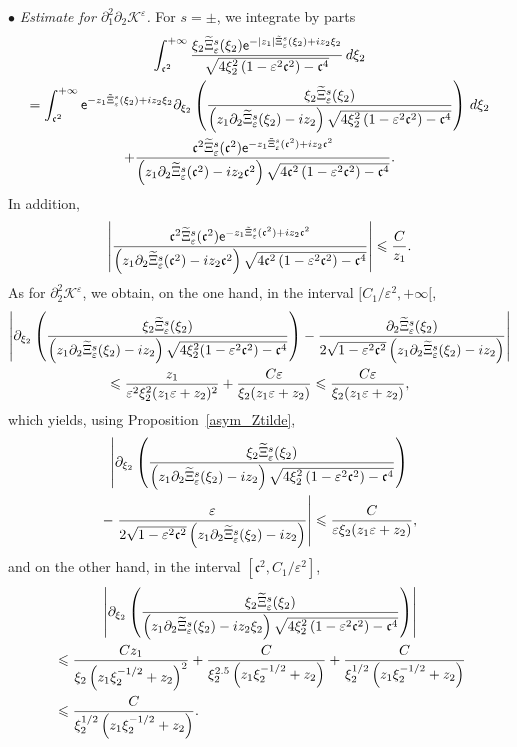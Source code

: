 \documentclass[10pt]{amsart}
\theoremstyle{definition}\newtheorem{defi}[theo]{Definition}\newtheorem{rema}[theo]{Remark}\newtheorem{exam}[theo]{Example}\newtheorem{exem}[theo]{Example}\newtheorem{nota}[theo]{Notation}
\newcommand*\p{\partial}
\newcommand*\BK{\mathcal{K}}
\newcommand*\ex{{\sf e}}
\newcommand*\cs{{\mathfrak c}}
\newcommand*\ii{\infty}
\newcommand*\ls{\leqslant }
\newcommand*\e{\varepsilon}
\renewcommand*\t{\tilde}
\let\oldtilde\tilde
\renewcommand*{\tilde}[1]{\mathchoice{\widetilde{#1}}{\widetilde{#1}}{\oldtilde{#1}}{\oldtilde{#1}}}
\begin{document}
\noindent $ \bullet $ \emph{Estimate for $ \p_1^2 \p_2 \BK^\e $.} For $ s = \pm $, we integrate by parts
\begin{multline}\label{IPP_K112_zero}
\int_{ \cs^2}^{+\ii} \frac{ \xi_2 \t\Xi_\e^s (\xi_2) \ex^{- |z_1| \t\Xi_\e^s (\xi_2) + i z_2 \xi_2} }{
\sqrt{ 4 \xi_2^2 \left(1 - \e^2 \cs^2\right) - \cs^4 } } \, d\xi_2
\\
 =
\int_{ \cs^2}^{+\ii} \ex^{- z_1 \t\Xi_\e^s (\xi_2) + i z_2 \xi_2 }
\p_{\xi_2} \left(\frac{ \xi_2 \t\Xi_\e^s (\xi_2) }{ \left(z_1 \p_2 \t\Xi_\e^s (\xi_2) - i z_2\right) \sqrt{ 4 \xi_2^2 \left(1 - \e^2 \cs^2\right) - \cs^4 } } \right) \, d\xi_2\\
+ \frac{ \cs^2 \t\Xi_\e^s (\cs^2) \ex^{- z_1 \t\Xi_\e^s (\cs^2) + i z_2 \cs^2 } }{\left(z_1 \p_2 \t\Xi_\e^s (\cs^2) - i z_2 \cs^2\right) \sqrt{ 4 \cs^2 \left(1 - \e^2 \cs^2\right) - \cs^4 } }.
\end{multline}
In addition,
\begin{align*}
\left\lvert
\frac{ \cs^2 \t\Xi_\e^s (\cs^2) \ex^{- z_1 \t\Xi_\e^s (\cs^2) + i z_2 \cs^2} }{\left(z_1 \p_2 \t\Xi_\e^s (\cs^2) - i z_2 \cs^2\right)
\sqrt{ 4 \cs^2\left(1 - \e^2 \cs^2\right) - \cs^4 } } \right\rvert
\ls \frac{C}{z_1 }.
\end{align*}
As for $ \p_2^2 \BK^\e $, we obtain, on the one hand, in the interval $ [C_1 / \e^{2}, +\ii [$,
\begin{multline*}
\left\lvert \p_{\xi_2} \left(\frac{ \xi_2 \t\Xi_\e^s (\xi_2) }{\left(z_1 \p_2 \t\Xi_\e^s (\xi_2) - i z_2\right) \sqrt{ 4 \xi_2^2 (1 - \e^2 \cs^2) - \cs^4 } } \right) - \frac{ \p_2 \t\Xi_\e^s (\xi_2) }{ 2 \sqrt{ 1 - \e^2 \cs^2 } \left(z_1 \p_2 \t\Xi_\e^s (\xi_2) - i z_2\right) }
\right\rvert
\\
\ls \frac{ z_1 }{ \e^2 \xi_2^2 (z_1 \e + z_2)^2 } + \frac{ C \e }{ \xi_2 (z_1 \e + z_2) }
\ls \frac{ C \e }{ \xi_2 (z_1 \e + z_2) },
\end{multline*}
which yields, using Proposition~\ref{asym_Ztilde},
\begin{multline}\label{IPPrevient}
\left\lvert \p_{\xi_2} \left(\frac{ \xi_2 \t\Xi_\e^s (\xi_2) }{\left(z_1 \p_2 \t\Xi_\e^s (\xi_2) - i z_2\right) \sqrt{ 4 \xi_2^2 \left(1 - \e^2 \cs^2\right) - \cs^4 } } \right)\right.\\ 
-\left. \frac{ \e }{ 2 \sqrt{ 1 - \e^2 \cs^2 } \left(z_1 \p_2 \t\Xi_\e^s (\xi_2) - i z_2\right) }
\right\rvert
\ls \frac{ C }{ \e \xi_2 (z_1 \e + z_2) },
\end{multline}
and on the other hand, in the interval $ [\cs^2, C_1 / \e^{2}] $,
\begin{multline*}
\left\lvert \p_{\xi_2} \left(\frac{ \xi_2 \t\Xi_\e^s (\xi_2) }{\left(z_1 \p_2 \t\Xi_\e^s (\xi_2) - i z_2 \xi_2\right) \sqrt{ 4 \xi_2^2\left(1 - \e^2 \cs^2\right) - \cs^4}} \right)\right\rvert
\\
\begin{aligned}
&\ls \frac{ C z_1 }{ \xi_2 \left(z_1 \xi_2^{-1/2} + z_2\right)^2 } + \frac{ C }{ \xi_2^{2.5} \left(z_1 \xi_2^{-1/2} + z_2\right) } + \frac{ C }{ \xi_2^{1/2} \left(z_1 \xi_2^{-1/2} + z_2\right) }\\
&\ls \frac{ C }{ \xi_2^{1/2}\left(z_1 \xi_2^{-1/2} + z_2\right) }.
\end{aligned}
\end{multline*}
\end{document}
